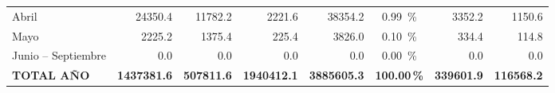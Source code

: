 \documentclass{report}
\begin{document}
\begin{table}[H]
{\begin{tabular}{l r r r r c r r}
            Abril              & \num{24350.4}        & \num{11782.2}        & \num{2221.6}      & \num{38354.2}          & \SI{0.99}{\percent}    & \num{3352.2}                 & \num{1150.6}                    \\
            Mayo               & \num{2225.2}         & \num{1375.4}         & \num{225.4}       & \num{3826.0}           & \SI{0.10}{\percent}    & \num{334.4}                  & \num{114.8}                     \\
            Junio -- Septiembre& \num{0.0}            & \num{0.0}            & \num{0.0}         & \num{0.0}              & \SI{0.00}{\percent}    & \num{0.0}                    & \num{0.0}                       \\
            \midrule
            \textbf{TOTAL AÑO} & \textbf{\num{1437381.6}} & \textbf{\num{507811.6}} & \textbf{\num{1940412.1}} & \textbf{\num{3885605.3}} & \textbf{100.00\,\%} & \textbf{\num{339601.9}} & \textbf{\num{116568.2}} \\
            \bottomrule
        \end{tabular}%
    }
    \label{tab:aica_mensual}
\end{table}
\end{document}
